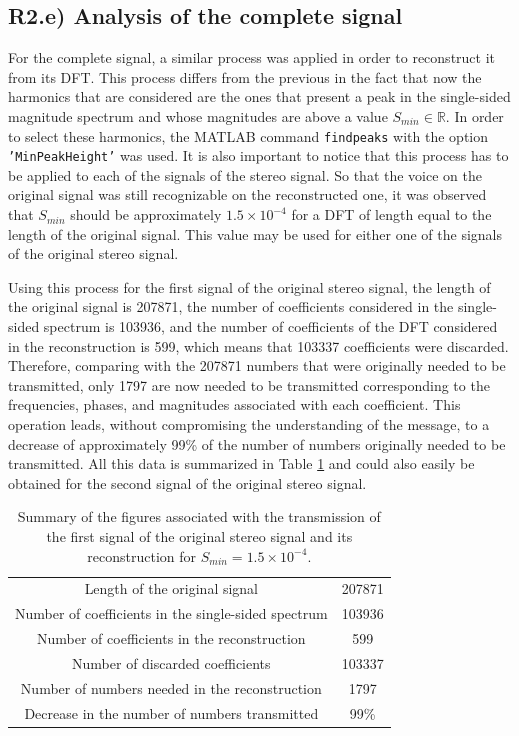 \documentclass[a4paper, oneside, 11pt]{article}
\begin{document}
\subsection{R2.e) Analysis of the complete signal}

For the complete signal, a similar process was applied in order to reconstruct it from its DFT. This process differs from the previous in the fact that now the harmonics that are considered are the ones that present a peak in the single-sided magnitude spectrum and whose magnitudes are above a value $S_{min} \in \mathbb{R}$. In order to select these harmonics, the MATLAB{\texttrademark} command \texttt{findpeaks} with the option \texttt{'MinPeakHeight'} was used. It is also important to notice that this process has to be applied to each of the signals of the stereo signal. So that the voice on the original signal was still recognizable on the reconstructed one, it was observed that $S_{min}$ should be approximately $1.5\times10^{-4}$ for a DFT of length equal to the length of the original signal. This value may be used for either one of the signals of the original stereo signal.

Using this process for the first signal of the original stereo signal, the length of the original signal is 207871, the number of coefficients considered in the single-sided spectrum is 103936, and the number of coefficients of the DFT considered in the reconstruction is 599, which means that 103337 coefficients were discarded. Therefore, comparing with the 207871 numbers that were originally needed to be transmitted, only 1797 are now needed to be transmitted corresponding to the frequencies, phases, and magnitudes associated with each coefficient. This operation leads, without compromising the understanding of the message, to a decrease of approximately 99\% of the number of numbers originally needed to be transmitted. All this data is summarized in Table \ref{tab:data_transmission} and could also easily be obtained for the second signal of the original stereo signal.

\begin{table}[ht]
    \centering
    \caption{Summary of the figures associated with the transmission of the first signal of the original stereo signal and its reconstruction for $S_{min} = 1.5 \times 10^{-4}$.}
    \begin{tabular}{cc}
        \hline
        Length of the original signal & 207871 \\
        Number of coefficients in the single-sided spectrum & 103936 \\
        Number of coefficients in the reconstruction & 599 \\
        Number of discarded coefficients & 103337 \\
        Number of numbers needed in the reconstruction & 1797 \\
        Decrease in the number of numbers transmitted & 99\% \\
        \hline
    \end{tabular}
    \label{tab:data_transmission}
\end{table}
\end{document}
